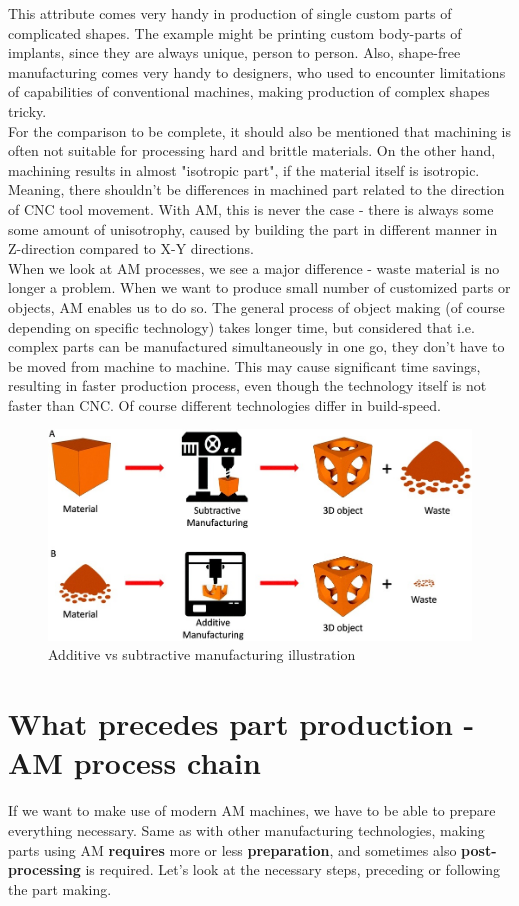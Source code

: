 \documentclass[a4paper, twoside, 11pt]{report}
\begin{document}
This attribute comes very handy in production of single custom parts of complicated shapes. The example might be printing custom body-parts of implants, since they are always unique, person to person. Also, shape-free manufacturing comes very handy to designers, who used to encounter limitations of capabilities of conventional machines, making production of complex shapes tricky.\\
For the comparison to be complete, it should also be mentioned that machining is often not suitable for processing hard and brittle materials. On the other hand, machining results in almost "isotropic part", if the material itself is isotropic. Meaning, there shouldn't be differences in machined part related to the direction of CNC tool movement. With AM, this is never the case - there is always some some amount of unisotrophy, caused by building the part in different manner in Z-direction compared to X-Y directions.\\
When we look at AM processes, we see a major difference - waste material is no longer a problem. When we want to produce small number of customized parts or objects, AM enables us to do so. The general process of object making (of course depending on specific technology) takes longer time, but considered that i.e. complex parts can be manufactured simultaneously in one go, they don't have to be moved from machine to machine. This may cause significant time savings, resulting in faster production process, even though the technology itself is not faster than CNC. Of course different technologies differ in build-speed.
\begin{figure}[h]
\centering
\includegraphics[scale=0.6]{additiveSubtractiveManufacturing}
\caption{Additive vs subtractive manufacturing illustration}
\end{figure}

\section{What precedes part production - AM process chain}
If we want to make use of modern AM machines, we have to be able to prepare everything necessary. Same as with other manufacturing  technologies, making parts using AM \textbf{requires} more or less \textbf{preparation}, and sometimes also \textbf{post-processing} is required. Let's look at the necessary steps, preceding or following the part making.\\
\end{document}
